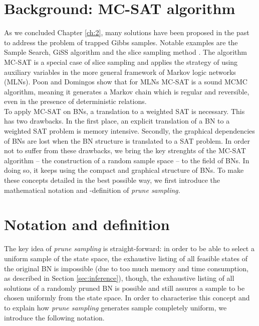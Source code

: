 \documentclass[a4paper, twoside, 11pt]{report}
\theoremstyle{plain}
\theoremstyle{definition}
\theoremstyle{remark}
\newcommand{\ps}{\textit{prune sampling }}
\newcommand{\psp}{\textit{prune sampling. }}
\begin{document}
\section{Background: MC-SAT algorithm}
As we concluded Chapter \ref{ch:2}, many solutions have been proposed in the past to address the problem of trapped Gibbs samples. Notable examples are the Sample Search, GiSS algorithm \cite{venugopal2013giss} and the slice sampling method \cite{besag1993spatial, damlen1999gibbs, gilks1996interdisciplinary}. The algorithm MC-SAT \cite{poon2006sound} is a special case of slice sampling and applies the strategy of using auxiliary variables in the more general framework of Markov logic networks (MLNs). Poon and Domingos show that for MLNs MC-SAT is a sound MCMC algorithm, meaning it generates a Markov chain which is regular and reversible, even in the presence of deterministic relations. \\

To apply MC-SAT on BNs, a translation to a weighted \gls{SAT} is necessary. This has two drawbacks. In the first place, an explicit translation of a BN to a weighted SAT problem is memory intensive. Secondly, the graphical dependencies of BNs are lost when the BN structure is translated to a SAT problem. In order not to suffer from these drawbacks, we bring the key strenghts of the MC-SAT algorithm -- the construction of a random sample space --  to the field of BNs. In doing so, it keeps using the compact and graphical structure of BNs. To make these concepts detailed in the best possible way, we first introduce the mathematical notation and -definition of \psp

\section{Notation and definition}
The key idea of \ps is straight-forward: in order to be able to select a uniform sample of the state space, the exhaustive listing of all feasible states of the original BN is impossible (due to too much memory and time consumption, as described in Section \ref{sec:inference}), though, the exhaustive listing of all solutions of a randomly pruned BN is possible and still assures a sample to be chosen uniformly from the state space. In order to characterise this concept and to explain how \ps generates sample completely uniform, we introduce the following notation. \\
\end{document}
